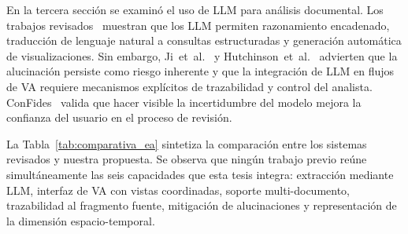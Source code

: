 En la tercera sección se examinó el uso de \acs{LLM} para análisis documental. Los trabajos revisados~\cite{ke2025document, yue2023event, wei2022, zhong2017seq2sql, ye2024dataframe, dibia2023lida} muestran que los \acs{LLM} permiten razonamiento encadenado, traducción de lenguaje natural a consultas estructuradas y generación automática de visualizaciones. Sin embargo, Ji~et~al.~\cite{ji2023} y Hutchinson~et~al.~\cite{hutchinson2024llm} advierten que la alucinación persiste como riesgo inherente y que la integración de \acs{LLM} en flujos de \ac{VA} requiere mecanismos explícitos de trazabilidad y control del analista. ConFides~\cite{ha2024confides} valida que hacer visible la incertidumbre del modelo mejora la confianza del usuario en el proceso de revisión.

La Tabla~\ref{tab:comparativa_ea} sintetiza la comparación entre los sistemas revisados y nuestra propuesta. Se observa que ningún trabajo previo reúne simultáneamente las seis capacidades que esta tesis integra: extracción mediante \acs{LLM}, interfaz de \ac{VA} con vistas coordinadas, soporte multi-documento, trazabilidad al fragmento fuente, mitigación de alucinaciones y representación de la dimensión espacio-temporal.

